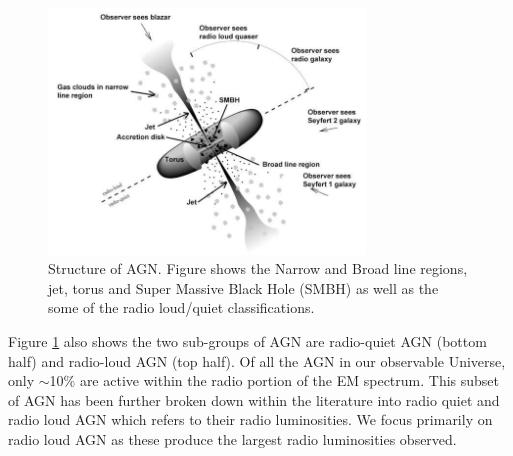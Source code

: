 \documentclass[a4paper, 10pt]{article}
\begin{document}
\begin{figure}[H]
\begin{center}
	\includegraphics[width=0.75\textwidth]{SMBH}
	\caption{Structure of AGN. Figure shows the Narrow and Broad line regions, jet, torus and Super Massive Black Hole (SMBH) as well as the some of the radio loud/quiet classifications\footnotemark.}
	\label{agnstruc}
\end{center}
\end{figure}
Figure \ref{agnstruc} also shows the two sub-groups of AGN are radio-quiet AGN (bottom half) and radio-loud AGN (top half). Of all the AGN in our observable Universe, only $\sim$10\% are active within the radio portion of the EM spectrum. This subset of AGN has been further broken down within the literature into radio quiet and radio loud AGN which refers to their radio luminosities. We focus primarily on radio loud AGN as these produce the largest radio luminosities observed.
\end{document}
